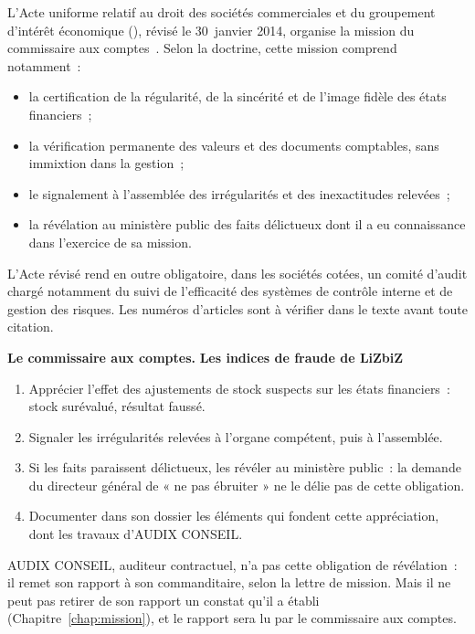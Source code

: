 L'Acte uniforme relatif au droit des sociétés commerciales et du
groupement d'intérêt économique (), révisé le 30~janvier
2014, organise la mission du commissaire aux
comptes~\cite{ohada2014auscgie}. Selon la doctrine, cette mission
comprend notamment~:
\begin{itemize}
    \item la certification de la régularité, de la sincérité et de l'image
          fidèle des états financiers~;
    \item la vérification permanente des valeurs et des documents
          comptables, sans immixtion dans la gestion~;
    \item le signalement à l'assemblée des irrégularités et des
          inexactitudes relevées~;
    \item la révélation au ministère public des faits délictueux dont il a
          eu connaissance dans l'exercice de sa mission.
\end{itemize}
L'Acte révisé rend en outre obligatoire, dans les sociétés cotées, un
comité d'audit chargé notamment du suivi de l'efficacité des systèmes de
contrôle interne et de gestion des risques. Les numéros d'articles sont à
vérifier dans le texte avant toute citation.

\begin{boxinfo}
\textbf{Le commissaire aux comptes.}
\textbf{Les indices de fraude de LiZbiZ}
\begin{enumerate}
    \item Apprécier l'effet des ajustements de stock suspects sur les états
          financiers~: stock surévalué, résultat faussé.
    \item Signaler les irrégularités relevées à l'organe compétent, puis à
          l'assemblée.
    \item Si les faits paraissent délictueux, les révéler au ministère
          public~: la demande du directeur général de « ne pas ébruiter »
          ne le délie pas de cette obligation.
    \item Documenter dans son dossier les éléments qui fondent cette
          appréciation, dont les travaux d'AUDIX CONSEIL.
\end{enumerate}
\end{boxinfo}

AUDIX CONSEIL, auditeur contractuel, n'a pas cette obligation de
révélation~: il remet son rapport à son commanditaire, selon la lettre de
mission. Mais il ne peut pas retirer de son rapport un constat qu'il a
établi (Chapitre~\ref{chap:mission}), et le rapport sera lu par le
commissaire aux comptes.

